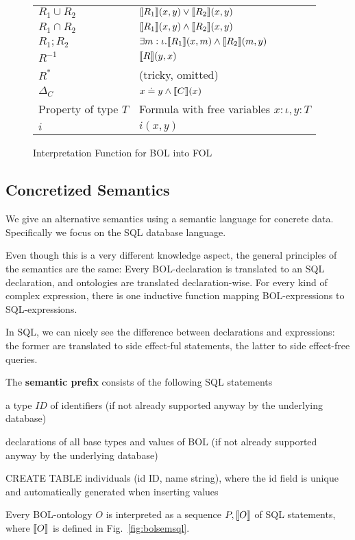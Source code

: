 \begin{figure}
\begin{center}
\begin{tabular}{l|l}
$R_1 \cup R_2$ & $\llbracket R_1\rrbracket(x,y)\vee \llbracket R_2\rrbracket(x,y)$\\
$R_1 \cap R_2$ & $\llbracket R_1\rrbracket(x,y)\wedge \llbracket R_2\rrbracket(x,y)$\\
$R_1 ; R_2$ & $\exists m:\iota.\llbracket R_1\rrbracket(x,m)\wedge \llbracket R_2\rrbracket(m,y)$\\
$R^{-1}$          & $\llbracket R\rrbracket(y,x)$\\
$R^*$          & (tricky, omitted)\\
$\Delta_C$     & $x\doteq y\wedge \llbracket C\rrbracket(x)$\\
\hline
Property of type $T$ & Formula with free variables $x:\iota,y:T$\\
$i$ & $i(x,y)$\\
\end{tabular}
\caption{Interpretation Function for BOL into FOL}\label{fig:bolsem}
\end{center}
\end{figure}

\subsection{Concretized Semantics}

We give an alternative semantics using a semantic language for concrete data.
Specifically we focus on the SQL database language.

Even though this is a very different knowledge aspect, the general principles of the semantics are the same:
Every BOL-declaration is translated to an SQL declaration, and ontologies are translated declaration-wise.
For every kind of complex expression, there is one inductive function mapping BOL-expressions to SQL-expressions.

In SQL, we can nicely see the difference between declarations and expressions: the former are translated to side effect-ful statements, the latter to side effect-free queries.

\begin{definition}
The \textbf{semantic prefix} consists of the following SQL statements
\begin{compactitem}
 \item a type $ID$ of identifiers (if not already supported anyway by the underlying database)
 \item declarations of all base types and values of BOL (if not already supported anyway by the underlying database)
 \item CREATE TABLE individuals (id ID, name string), where the id field is unique and automatically generated when inserting values
\end{compactitem}

Every BOL-ontology $O$ is interpreted as a sequence $P,\llbracket O\rrbracket$ of SQL statements, where $\llbracket O\rrbracket$ is defined in Fig.~\ref{fig:bolsemsql}.
\end{definition}

